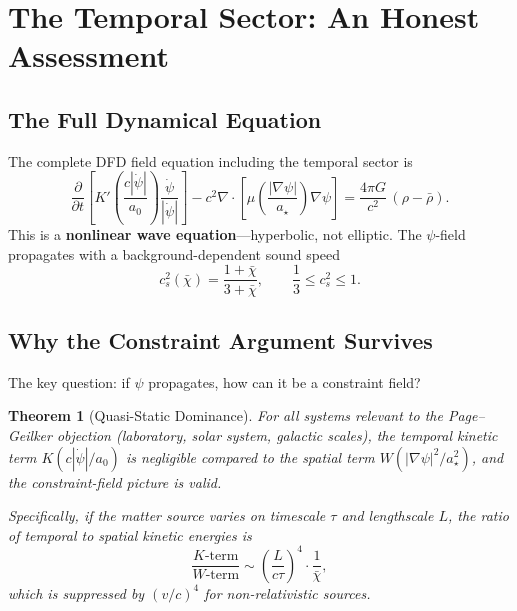 \documentclass[11pt,a4paper]{article}
\newtheorem{theorem}{Theorem}[section]
\begin{document}
\section{The Temporal Sector: An Honest Assessment}
\label{sec:temporal}

\subsection{The Full Dynamical Equation}

The complete DFD field equation including the temporal sector is
\begin{equation}\label{eq:full-wave}
\frac{\partial}{\partial t}\!\left[K'\!\left(\frac{c|\dot\psi|}{a_0}\right)
\frac{\dot\psi}{|\dot\psi|}\right]
- c^2\nabla\cdot\!\left[\mu\!\left(\frac{|\nabla\psi|}{a_\star}\right)
\nabla\psi\right]
= \frac{4\pi G}{c^2}\,(\rho - \bar\rho).
\end{equation}
This is a \textbf{nonlinear wave equation}---hyperbolic, not elliptic.
The $\psi$-field propagates with a background-dependent sound speed
\begin{equation}
c_s^2(\bar\chi) = \frac{1 + \bar\chi}{3 + \bar\chi},
\qquad
\frac{1}{3} \leq c_s^2 \leq 1.
\end{equation}

\subsection{Why the Constraint Argument Survives}

The key question: if $\psi$ propagates, how can it be a constraint field?

\begin{theorem}[Quasi-Static Dominance]
\label{thm:quasistatic}
For all systems relevant to the Page--Geilker objection (laboratory,
solar system, galactic scales), the temporal kinetic term
$K(c|\dot\psi|/a_0)$ is negligible compared to the spatial term
$W(|\nabla\psi|^2/a_\star^2)$, and the constraint-field picture is
valid.

Specifically, if the matter source varies on timescale $\tau$ and
lengthscale $L$, the ratio of temporal to spatial kinetic energies is
\begin{equation}\label{eq:ratio}
\frac{K\text{-term}}{W\text{-term}}
\sim \left(\frac{L}{c\tau}\right)^4 \cdot \frac{1}{\bar\chi},
\end{equation}
which is suppressed by $(v/c)^4$ for non-relativistic sources.
\end{theorem}
\end{document}
